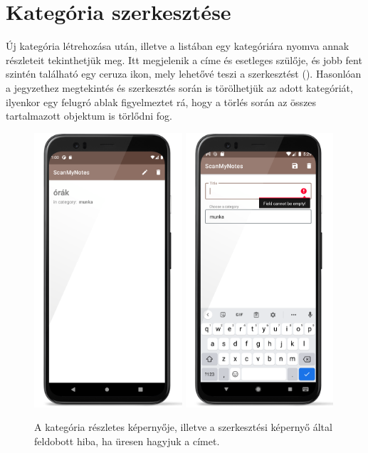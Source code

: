 \section{Kategória szerkesztése}
Új kategória létrehozása után, illetve a listában egy kategóriára nyomva annak részleteit tekinthetjük meg. Itt megjelenik a címe és esetleges szülője, és jobb fent szintén található egy ceruza ikon, mely lehetővé teszi a szerkesztést (). Hasonlóan a jegyzethez megtekintés és szerkesztés során is törölhetjük az adott kategóriát, ilyenkor egy felugró ablak figyelmeztet rá, hogy a törlés során az összes tartalmazott objektum is törlődni fog.

\begin{figure}[!ht]
	\centering
	\includegraphics[width=55mm, keepaspectratio]{figures/category_view.png}
	\includegraphics[width=55mm, keepaspectratio]{figures/category_edit_error.png}
	\caption{A kategória részletes képernyője, illetve a szerkesztési képernyő által feldobott hiba, ha üresen hagyjuk a címet.}
	\label{fig:CategoryDetailsScreen}
\end{figure}